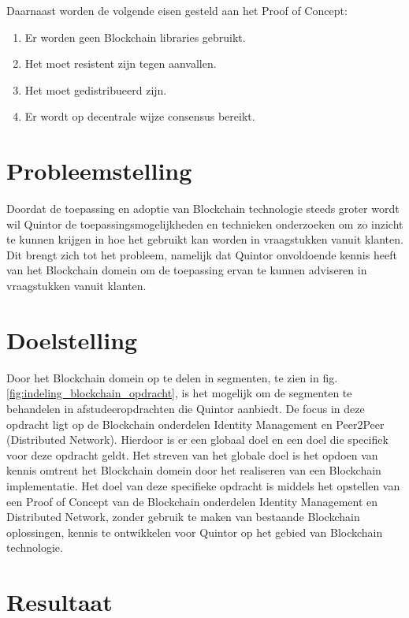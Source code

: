 Daarnaast worden de volgende eisen gesteld aan het Proof of Concept:
\begin{enumerate}[noitemsep]
  \item Er worden geen Blockchain libraries gebruikt.
  \item Het moet resistent zijn tegen aanvallen.
  \item Het moet gedistribueerd zijn.
  \item Er wordt op decentrale wijze consensus bereikt.
\end{enumerate}

\section{Probleemstelling}

Doordat de toepassing en adoptie van Blockchain technologie steeds groter wordt wil Quintor de toepassingsmogelijkheden en technieken onderzoeken om zo inzicht te kunnen krijgen in hoe het gebruikt kan worden in vraagstukken vanuit klanten. Dit brengt zich tot het probleem, namelijk dat Quintor onvoldoende kennis heeft van het Blockchain domein om de toepassing ervan te kunnen adviseren in vraagstukken vanuit klanten.

\section{Doelstelling}

Door het Blockchain domein op te delen in segmenten, te zien in fig. \ref{fig:indeling_blockchain_opdracht}, is het mogelijk om de segmenten te behandelen in afstudeeropdrachten die Quintor aanbiedt. De focus in deze opdracht ligt op de Blockchain onderdelen Identity Management en Peer2Peer (Distributed Network). Hierdoor is er een globaal doel en een doel die specifiek voor deze opdracht geldt. Het streven van het globale doel is het opdoen van kennis omtrent het Blockchain domein door het realiseren van een Blockchain implementatie. Het doel van deze specifieke opdracht is middels het opstellen van een Proof of Concept van de Blockchain onderdelen Identity Management en Distributed Network, zonder gebruik te maken van bestaande Blockchain oplossingen, kennis te ontwikkelen voor Quintor op het gebied van Blockchain technologie.

\section{Resultaat}


